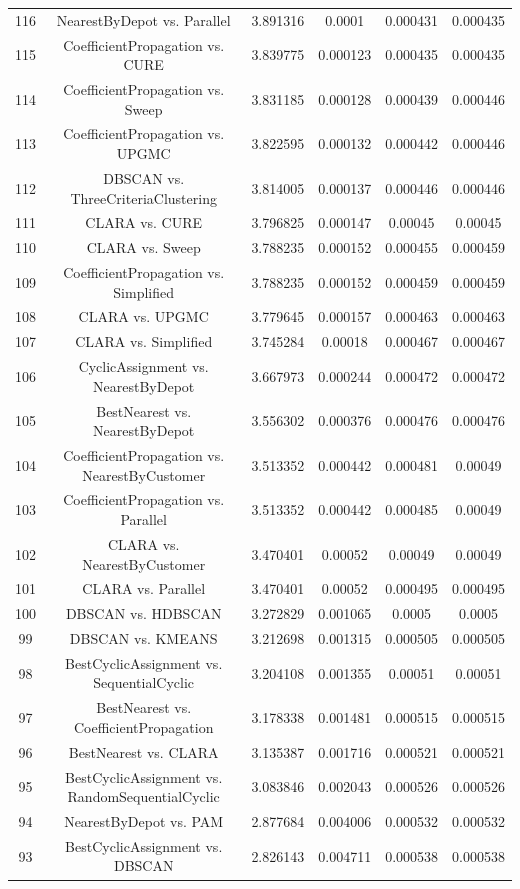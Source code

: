 \documentclass[a4paper,10pt]{article}
\begin{document}
\begin{landscape}
\begin{table}[!htp]
\begin{tabular}{cccccc}
116&NearestByDepot vs. Parallel&3.891316&0.0001&0.000431&0.000435\\
115&CoefficientPropagation vs. CURE&3.839775&0.000123&0.000435&0.000435\\
114&CoefficientPropagation vs. Sweep&3.831185&0.000128&0.000439&0.000446\\
113&CoefficientPropagation vs. UPGMC&3.822595&0.000132&0.000442&0.000446\\
112&DBSCAN vs. ThreeCriteriaClustering&3.814005&0.000137&0.000446&0.000446\\
111&CLARA vs. CURE&3.796825&0.000147&0.00045&0.00045\\
110&CLARA vs. Sweep&3.788235&0.000152&0.000455&0.000459\\
109&CoefficientPropagation vs. Simplified&3.788235&0.000152&0.000459&0.000459\\
108&CLARA vs. UPGMC&3.779645&0.000157&0.000463&0.000463\\
107&CLARA vs. Simplified&3.745284&0.00018&0.000467&0.000467\\
106&CyclicAssignment vs. NearestByDepot&3.667973&0.000244&0.000472&0.000472\\
105&BestNearest vs. NearestByDepot&3.556302&0.000376&0.000476&0.000476\\
104&CoefficientPropagation vs. NearestByCustomer&3.513352&0.000442&0.000481&0.00049\\
103&CoefficientPropagation vs. Parallel&3.513352&0.000442&0.000485&0.00049\\
102&CLARA vs. NearestByCustomer&3.470401&0.00052&0.00049&0.00049\\
101&CLARA vs. Parallel&3.470401&0.00052&0.000495&0.000495\\
100&DBSCAN vs. HDBSCAN&3.272829&0.001065&0.0005&0.0005\\
99&DBSCAN vs. KMEANS&3.212698&0.001315&0.000505&0.000505\\
98&BestCyclicAssignment vs. SequentialCyclic&3.204108&0.001355&0.00051&0.00051\\
97&BestNearest vs. CoefficientPropagation&3.178338&0.001481&0.000515&0.000515\\
96&BestNearest vs. CLARA&3.135387&0.001716&0.000521&0.000521\\
95&BestCyclicAssignment vs. RandomSequentialCyclic&3.083846&0.002043&0.000526&0.000526\\
94&NearestByDepot vs. PAM&2.877684&0.004006&0.000532&0.000532\\
93&BestCyclicAssignment vs. DBSCAN&2.826143&0.004711&0.000538&0.000538\\

\end{tabular}
\end{table}
\end{landscape}
\end{document}
